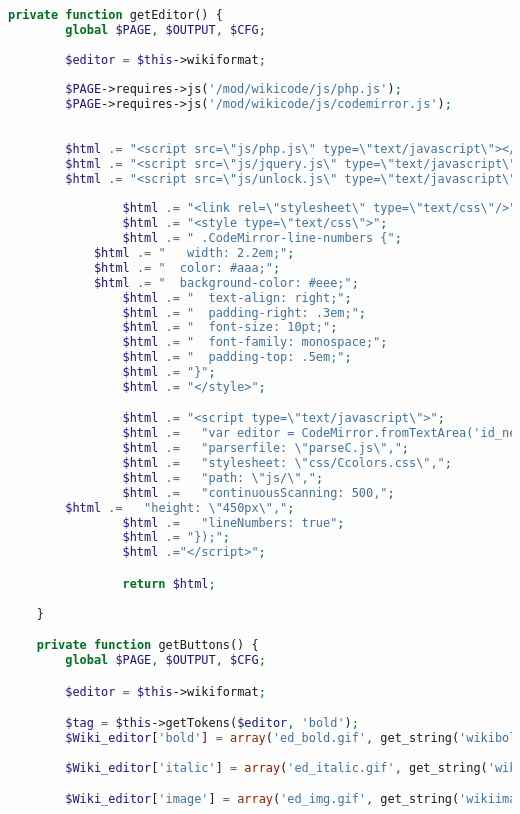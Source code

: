 \begin{lstlisting}[language=PHP]
	private function getEditor() {
		global $PAGE, $OUTPUT, $CFG;
		
		$editor = $this->wikiformat;
		
		$PAGE->requires->js('/mod/wikicode/js/php.js');
		$PAGE->requires->js('/mod/wikicode/js/codemirror.js');
			
			
		$html .= "<script src=\"js/php.js\" type=\"text/javascript\"></script>";
		$html .= "<script src=\"js/jquery.js\" type=\"text/javascript\"></script>";
		$html .= "<script src=\"js/unlock.js\" type=\"text/javascript\"></script>";
       
        		$html .= "<link rel=\"stylesheet\" type=\"text/css\"/>";
        		$html .= "<style type=\"text/css\">";
        		$html .= " .CodeMirror-line-numbers {";
       		$html .= "   width: 2.2em;";
       		$html .= "  color: #aaa;";
       		$html .= "  background-color: #eee;";
        		$html .= "  text-align: right;";
        		$html .= "  padding-right: .3em;";
        		$html .= "  font-size: 10pt;";
        		$html .= "  font-family: monospace;";
        		$html .= "  padding-top: .5em;";
        		$html .= "}";
        		$html .= "</style>";

        		$html .= "<script type=\"text/javascript\">";
        		$html .=   "var editor = CodeMirror.fromTextArea('id_newcontent', {";
        		$html .=   "parserfile: \"parseC.js\",";
        		$html .=   "stylesheet: \"css/Ccolors.css\",";
        		$html .=   "path: \"js/\",";
        		$html .=   "continuousScanning: 500,";
		$html .=   "height: \"450px\",";
        		$html .=   "lineNumbers: true";
        		$html .= "});";
        		$html .="</script>";

        		return $html;
		
	}

    private function getButtons() {
        global $PAGE, $OUTPUT, $CFG;

        $editor = $this->wikiformat;

        $tag = $this->getTokens($editor, 'bold');
        $Wiki_editor['bold'] = array('ed_bold.gif', get_string('wikiboldtext', 'Wikicode'), $tag[0], $tag[1], get_string('wikiboldtext', 'Wikicode'));
		
        $Wiki_editor['italic'] = array('ed_italic.gif', get_string('wikiitalictext', 'Wikicode'), $tag[0], $tag[1], get_string('wikiitalictext', 'Wikicode'));

        $Wiki_editor['image'] = array('ed_img.gif', get_string('wikiimage', 'Wikicode'), $imagetag[0], $imagetag[1], get_string('wikiimage', 'Wikicode'));


\end{lstlisting}
